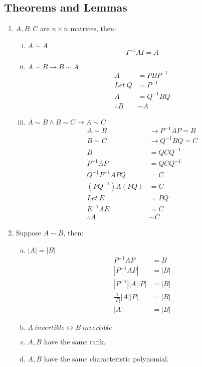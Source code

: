 \documentclass{math}
\begin{document}
\subsection*{Theorems and Lemmas}
\begin{enumerate}[{Theorem} 1:]
  \item \( A,B,C \) are \( n\times n \) matrices, then:
  \begin{enumerate}[(i)]
    \item \( A\sim A \)
    \[ I^{-1}AI = A \]
    \item \( A\sim B \to B\sim A \)
    \begin{align*}
      A &= PBP^{-1} \\
      Let~Q &= P^{-1} \\
      A &= Q^{-1}BQ \\
      \therefore B&\sim A
    \end{align*}
    \item \( A\sim B \wedge B\sim C \to A\sim C \)
    \begin{align*}
      A\sim B &\to P^{-1}AP = B \\
      B\sim C &\to Q^{-1}BQ = C \\
      B &= QCQ^{-1} \\
      P^{-1}AP &= QCQ^{-1} \\
      Q^{-1}P^{-1}APQ &= C \\
      (PQ^{-1})A(PQ) &= C \\
      Let~E &= PQ \\
      E^{-1}AE &= C \\
      \therefore A&\sim C
    \end{align*}
  \end{enumerate}
  \item Suppose \( A\sim B \), then:
  \begin{enumerate}[(a)]
    \item \( |A| = |B| \)
    \begin{align*}
      P^{-1}AP &= B \\
      |P^{-1}AP| &= |B| \\
      |P^{-1}||A||P| &= |B| \\
      \frac{1}{|P|}|A||P| &= |B| \\
      |A| &= |B|
    \end{align*}
    \item \( A~invertible\leftrightarrow B~invertible \)
    \item \( A,B \) have the same rank.
    \item \( A,B \) have the same characteristic polynomial.

\end{enumerate}
\end{enumerate}
\end{document}
